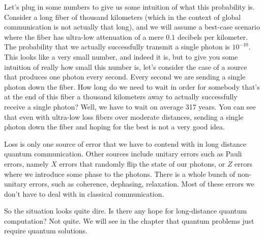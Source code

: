 Let's plug in some numbers to give us some intuition of what this probability is. Consider a long fiber of thousand kilometers (which in the context of global communication is not actually that long), and we will assume a best-case scenario where the fiber has ultra-low attenuation of a mere $0.1$ decibels per kilometer. The probability that we actually successfully transmit a single photon is $10^{-10}$. This looks like a very small number, and indeed it is, but to give you some intuition of really how small this number is, let's consider the case of a source that produces one photon every second. Every second we are sending a single photon down the fiber. How long do we need to wait in order for somebody that's at the end of this fiber a thousand kilometers away to actually successfully receive a single photon? Well, we have to wait on average 317 years. You can see that even with ultra-low loss fibers over moderate distances, sending a single photon down the fiber and hoping for the best is not a very good idea.

Loss is only one source of error that we have to contend with in long distance quantum communication. Other sources include unitary errors such as Pauli errors, namely $X$ errors that randomly flip the state of our photons, or $Z$ errors where we introduce some phase to the photons. There is a whole bunch of non-unitary errors, such as coherence, dephasing, relaxation.  Most of these errors we don't have to deal with in classical communication.

So the situation looks quite dire. Is there any hope for long-distance quantum computation? Not quite. We will see in the chapter that quantum problems just require quantum solutions.



\newpage
\begin{exercises}





\end{exercises}

